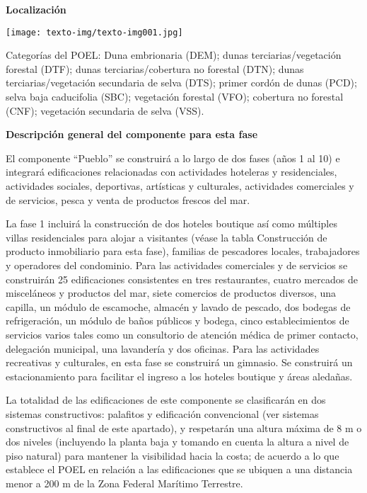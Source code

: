 \documentclass[twoside]{article}
\begin{document}
\begin{multicols}{2}

\bigskip

\footnotesize\textcolor{myblue2} {\textbf{ Localización}}


\bigskip

 \texttt{[image: texto-img/texto-img001.jpg]} 


\bigskip


\bigskip

\footnotesize Categorías del POEL: Duna embrionaria (DEM); dunas terciarias/vegetación forestal (DTF); dunas terciarias/cobertura no forestal (DTN); dunas terciarias/vegetación secundaria de selva (DTS); primer cordón de dunas (PCD); selva baja caducifolia (SBC); vegetación forestal (VFO); cobertura no forestal (CNF); vegetación secundaria de selva (VSS).


\bigskip


\bigskip

\textcolor{myblue2} {\textbf{Descripción general del componente para esta fase}}


\bigskip

\footnotesize El componente “Pueblo” se construirá a lo largo de dos fases (años 1 al 10) e integrará edificaciones relacionadas con actividades hoteleras y residenciales, actividades sociales, deportivas, artísticas y culturales, actividades comerciales y de servicios, pesca y venta de productos frescos del mar.

La fase 1 incluirá la construcción de dos hoteles boutique así como múltiples villas residenciales para alojar a visitantes (véase la tabla Construcción de producto inmobiliario para esta fase), familias de pescadores locales, trabajadores y operadores del condominio. Para las actividades comerciales y de servicios se construirán 25 edificaciones consistentes en tres restaurantes, cuatro mercados de misceláneos y productos del mar, siete comercios de productos diversos, una capilla, un módulo de escamoche, almacén y lavado de pescado, dos bodegas de refrigeración, un módulo de baños públicos y bodega, cinco establecimientos de servicios varios tales como un consultorio de atención médica de primer contacto, delegación municipal, una lavandería y dos oficinas. Para las actividades recreativas y culturales, en esta fase se construirá un gimnasio. Se construirá un estacionamiento para facilitar el ingreso a los hoteles boutique y áreas aledañas. 

La totalidad de las edificaciones de este componente se clasificarán en dos sistemas constructivos: palafitos y edificación convencional (ver sistemas constructivos al final de este apartado), y respetarán una altura máxima de 8 m o dos niveles (incluyendo la planta baja y tomando en cuenta la altura a nivel de piso natural) para mantener la visibilidad hacia la costa; de acuerdo a lo que establece el POEL en relación a las edificaciones que se ubiquen a una distancia menor a 200 m de la Zona Federal Marítimo Terrestre.


\end{multicols}
\end{document}
